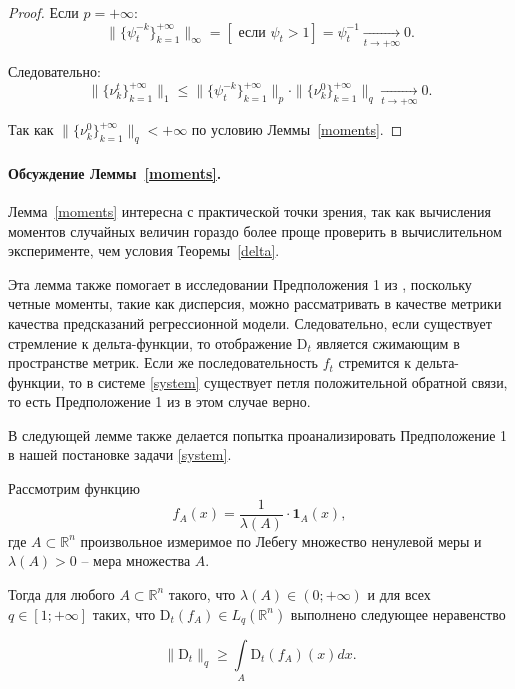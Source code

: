 \begin{proof}
            Если $p = +\infty$:
            \begin{equation*}
                \|\{\psi_t^{-k}\}_{k=1}^{+\infty}\|_{\infty} = \left[ \text{ если } \psi_t > 1 \right] = \psi_t^{-1} \underset{t \to +\infty}{\longrightarrow} 0.
            \end{equation*}
            
            Следовательно: 
            \begin{equation*}
                \|\{\nu_k^t\}_{k=1}^{+\infty}\|_1 \leq \|\{\psi_t^{-k}\}_{k=1}^{+\infty}\|_p \cdot \|\{\nu_k^0\}_{k=1}^{+\infty}\|_q \underset{t \to +\infty}{\longrightarrow} 0.
            \end{equation*}
            
            Так как $\|\{\nu_k^0\}_{k=1}^{+\infty}\|_q < +\infty$ по условию Леммы~\ref{moments}.
        \end{proof}
    
        \paragraph{Обсуждение Леммы~\ref{moments}.} Лемма~\ref{moments} интересна с практической точки зрения, так как вычисления моментов случайных величин гораздо более проще проверить в вычислительном эксперименте, чем условия Теоремы~\ref{delta}. 
    
        Эта лемма также помогает в исследовании Предположения 1 из \citep{khritankov2021hidden}, поскольку четные моменты, такие как дисперсия, можно рассматривать в качестве метрики качества предсказаний регрессионной модели. Следовательно, если существует стремление к дельта-функции, то отображение $\text{D}_t$ является сжимающим в пространстве метрик. Если же последовательность $f_t$ стремится к дельта-функции, то в системе \eqref{system} существует петля положительной обратной связи, то есть Предположение 1 из \cite{khritankov2021hidden} в этом случае верно.
    
        В следующей лемме также делается попытка проанализировать Предположение 1 в нашей постановке задачи \eqref{system}.
    
        \begin{lemma} \label{ineq_q}
            Рассмотрим функцию
            \begin{equation*}
                f_A(x) = \dfrac{1}{\lambda(A)} \cdot \textbf{1}_{A}(x),
            \end{equation*}
            где $A \subset \mathbb{R}^n$ произвольное измеримое по Лебегу множество ненулевой меры и $\lambda(A) > 0$ -- мера множества $A$.
    
            Тогда для любого $A \subset \mathbb{R}^n$ такого, что $\lambda(A) \in (0; +\infty)$ и для всех $q \in [1; +\infty]$ таких, что $\text{D}_t(f_A) \in L_q(\mathbb{R}^n)$ выполнено следующее неравенство
    
            \begin{equation*}
                \|\text{D}_t\|_q \geq \int\limits_{A} \text{D}_t(f_A)(x)dx.
            \end{equation*}
        \end{lemma}

